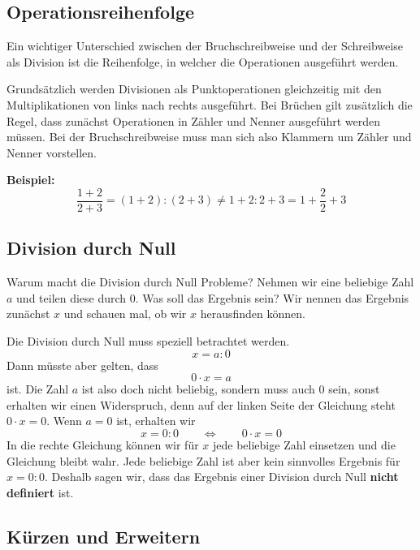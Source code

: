 \subsection{Operationsreihenfolge}

Ein wichtiger Unterschied zwischen der Bruchschreibweise und der Schreibweise als Division ist die Reihenfolge, in welcher die Operationen ausgeführt werden.

Grundsätzlich werden Divisionen als Punktoperationen gleichzeitig mit den Multiplikationen von links nach rechts ausgeführt. Bei Brüchen gilt zusätzlich die Regel, dass zunächst Operationen in Zähler und Nenner ausgeführt werden müssen. Bei der Bruchschreibweise muss man sich also Klammern um Zähler und Nenner vorstellen.
\begin{example}
  \textbf{Beispiel:}
  \[
    \frac{1+2}{2+3} = (1+2):(2+3) \ne 1+2:2+3 = 1+\frac{2}{2}+3
  \]
\end{example}

\subsection{Division durch Null}

Warum macht die Division durch Null Probleme? Nehmen wir eine beliebige Zahl $a$ und teilen diese durch $0$. Was soll das Ergebnis sein? Wir nennen das Ergebnis zunächst $x$ und schauen mal, ob wir $x$ herausfinden können.

Die Division durch Null muss speziell betrachtet werden.
\[
  x = a:0
\]
Dann müsste aber gelten, dass
\[
  0\cdot x = a
\]
ist. Die Zahl $a$ ist also doch nicht beliebig, sondern muss auch $0$ sein, sonst erhalten wir einen Widerspruch, denn auf der linken Seite der Gleichung steht $0\cdot x = 0$. Wenn $a = 0$ ist, erhalten wir
\[
  x = 0:0 \qquad\Leftrightarrow\qquad 0\cdot x = 0
\]
In die rechte Gleichung können wir für $x$ jede beliebige Zahl einsetzen und die Gleichung bleibt wahr. Jede beliebige Zahl ist aber kein sinnvolles Ergebnis für $x = 0 : 0$. Deshalb sagen wir, dass das Ergebnis einer Division durch Null \textbf{nicht definiert} ist.


\subsection{Kürzen und Erweitern}


